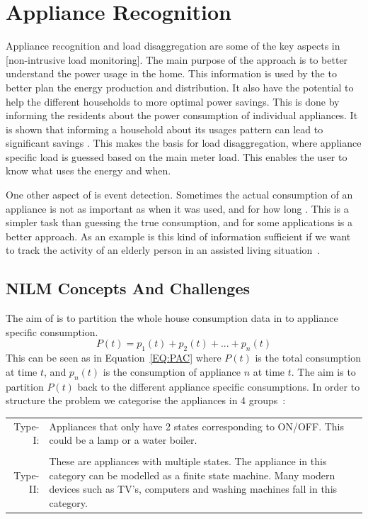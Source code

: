 \chapter{Appliance Recognition }
\label{sec:AppRec}
Appliance recognition and load disaggregation are some of the key aspects in [non-intrusive load monitoring]. The main purpose of the  approach is to better understand the power usage in the home. This information is used by the  to better plan the energy production and distribution. It also have the potential to help the different households to more optimal power savings. This is done by informing the residents about the power consumption of individual appliances. It is shown that informing a household about its usages pattern can lead to significant savings \citep{RefWorks:33}. This makes the basis for load disaggregation, where appliance specific load is guessed based on the main meter load. This enables the user to know what uses the energy and when.

One other aspect of  is event detection. Sometimes the actual consumption of an appliance is not as important as when it was used, and for how long \citep{RefWorks:23}. This is a simpler task than guessing the true consumption, and for some applications is a better approach. As an example is this kind of information sufficient if we want to track the activity of an elderly person in an assisted living situation~\citep{RefWorks:47}. 

\section{NILM Concepts And Challenges} 
The aim of  is to partition the whole house consumption data in to appliance specific consumption. 
\begin{equation}
	P(t) = p_1(t) + p_2(t) + ... + p_n(t)
	\label{EQ:PAC}
\end{equation}
This can be seen as in Equation~\ref{EQ:PAC} where $P(t)$ is the total consumption at time $t$, and $p_n(t)$ is the consumption of appliance $n$ at time $t$. The aim is to partition $P(t)$ back to the different appliance specific consumptions. In order to structure the problem we categorise the appliances in 4 groups~\citep{RefWorks:17}: 

\begin{tabularx}{\linewidth}{ r X }
Type-I:&Appliances that only have 2 states corresponding to ON/OFF. This could be a lamp or a water boiler. \\
\\
Type-II:&These are appliances with multiple states. The appliance in this category can be modelled as a finite state machine. Many modern devices such as TV's, computers and washing machines fall in this category.   \\
\end{tabularx}

